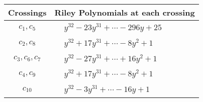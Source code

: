 \documentclass[1p]{elsarticle_modified}
\theoremstyle{definition}
\begin{document}
\begin{tabular}{m{50pt}|m{274pt}}
Crossings & \hspace{64pt}Riley Polynomials at each crossing \\
\hline $$\begin{aligned}c_{1},c_{5}\end{aligned}$$&$\begin{aligned}
&y^{32}-23 y^{31}+\cdots-296 y+25
\end{aligned}$\\
\hline $$\begin{aligned}c_{2},c_{8}\end{aligned}$$&$\begin{aligned}
&y^{32}+17 y^{31}+\cdots-8 y^2+1
\end{aligned}$\\
\hline $$\begin{aligned}c_{3},c_{6},c_{7}\end{aligned}$$&$\begin{aligned}
&y^{32}-27 y^{31}+\cdots+16 y^2+1
\end{aligned}$\\
\hline $$\begin{aligned}c_{4},c_{9}\end{aligned}$$&$\begin{aligned}
&y^{32}+17 y^{31}+\cdots-8 y^2+1
\end{aligned}$\\
\hline $$\begin{aligned}c_{10}\end{aligned}$$&$\begin{aligned}
&y^{32}-3 y^{31}+\cdots-16 y+1
\end{aligned}$\\
\hline
\end{tabular}
\vskip 2pc
\end{document}
